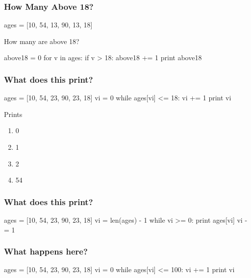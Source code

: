 \begin{frame}[fragile]
\frametitle{How Many Above 18?}

\begin{python}
ages = [10, 54, 13, 90, 13, 18]
\end{python}

How many are above 18?

\pause

\begin{python}
above18 = 0
for v in ages:
    if v > 18:
        above18 += 1
print above18
\end{python}

\end{frame}


\begin{frame}[fragile]
\frametitle{What does this print?}

\begin{python}
ages = [10, 54, 23, 90, 23, 18]
vi = 0
while ages[vi] <= 18:
    vi += 1
print vi
\end{python}

Prints

\begin{enumerate}
\item 0
\item 1
\item 2
\item 54
\end{enumerate}

\end{frame}

\begin{frame}[fragile]
\frametitle{What does this print?}

\begin{python}
ages = [10, 54, 23, 90, 23, 18]
vi = len(ages) - 1
while vi >= 0:
    print ages[vi]
    vi -= 1
\end{python}

\end{frame}


\begin{frame}[fragile]
\frametitle{What happens here?}

\begin{python}
ages = [10, 54, 23, 90, 23, 18]
vi = 0
while ages[vi] <= 100:
    vi += 1
print vi
\end{python}

\end{frame}


